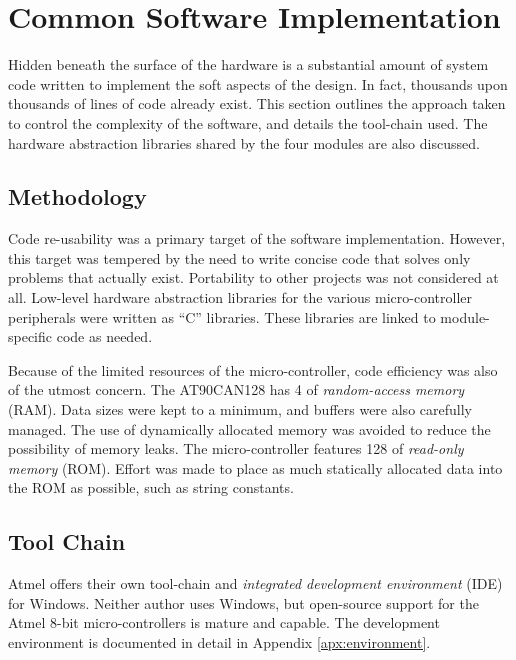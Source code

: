 \section{Common Software Implementation\label{sec:common_software_implementation}}

Hidden beneath the surface of the hardware is a substantial amount of system code written to implement the soft aspects of the design. In fact, thousands upon thousands of lines of code already exist. This section outlines the approach taken to control the complexity of the software, and details the tool-chain used. The hardware abstraction libraries shared by the four modules are also discussed.

\subsection{Methodology}
\label{sec:imp_software_meth}

Code re-usability was a primary target of the software implementation. However, this target was tempered by the need to write concise code that solves only problems that actually exist. Portability to other projects was not considered at all. Low-level hardware abstraction libraries for the various micro-controller peripherals were written as ``C'' libraries. These libraries are linked to module-specific code as needed. 


Because of the limited resources of the micro-controller, code efficiency was also of the utmost concern. The AT90CAN128 has \unit{4}{\kilo\byte} of \emph{random-access memory} (RAM). Data sizes were kept to a minimum, and buffers were also carefully managed. The use of dynamically allocated memory was avoided to reduce the possibility of memory leaks. The micro-controller features \unit{128}{\kilo\byte} of \emph{read-only memory} (ROM). Effort was made to place as much statically allocated data into the ROM as possible, such as string constants.

\subsection{Tool Chain}

Atmel offers their own tool-chain and \emph{integrated development environment} (IDE) for Windows. Neither author uses Windows, but open-source support for the Atmel 8-bit micro-controllers is mature and capable. The development environment is documented in detail in Appendix \ref{apx:environment}.

